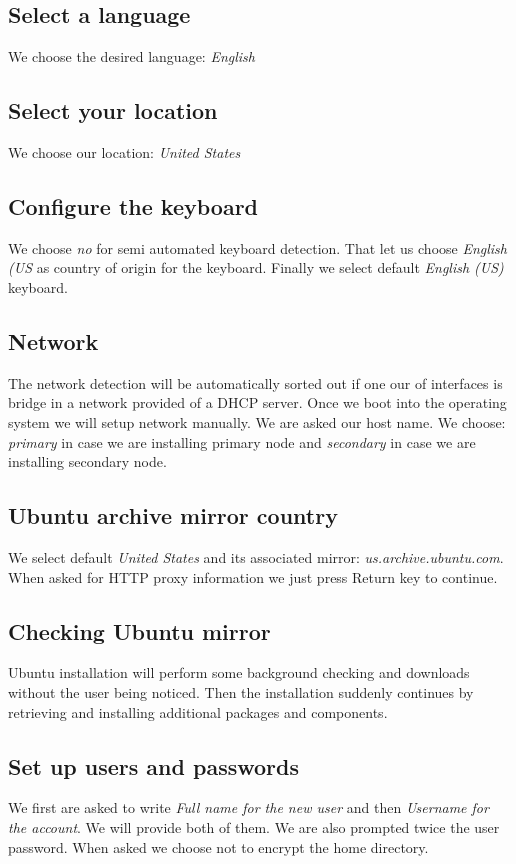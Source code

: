 \subsection {Select a language}
We choose the desired language: \textit{English}
\subsection {Select your location}
We choose our location: \textit{United States}
\subsection {Configure the keyboard}
We choose \textit{no} for semi automated keyboard detection. That let us choose \textit{English (US} as country of origin for the keyboard. Finally we select default \textit{English (US)} keyboard.
\subsection {Network}
The network detection will be automatically sorted out if one our of interfaces is bridge in a network provided of a DHCP server. Once we boot into the operating system we will setup network manually. We are asked our host name. We choose: \textit{primary} in case we are installing primary node and \textit{secondary} in case we are installing secondary node.
\subsection {Ubuntu archive mirror country}
We select default \textit{United States} and its associated mirror: \textit{us.archive.ubuntu.com}. When asked for HTTP proxy information we just press Return key to continue.
\subsection {Checking Ubuntu mirror}
Ubuntu installation will perform some background checking and downloads without the user being noticed. Then the installation suddenly continues by retrieving and installing additional packages and components.
\subsection {Set up users and passwords}
We first are asked to write \textit{Full name for the new user} and then \textit{Username for the account}. We will provide both of them. We are also prompted twice the user password. When asked we choose not to encrypt the home directory.
